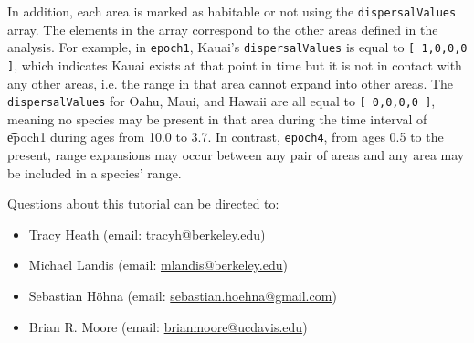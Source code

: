 In addition, each area is marked as habitable or not using the {\tt dispersalValues} array.
The elements in the array correspond to the other areas defined in the analysis.
For example, in {\tt epoch1}, Kauai's {\tt dispersalValues} is equal to {\tt [ 1,0,0,0 ]}, which indicates Kauai exists at that point in time but it is not in contact with any other areas, i.e. the range in that area cannot expand into other areas.
The {\tt dispersalValues} for Oahu, Maui, and Hawaii are all equal to {\tt [ 0,0,0,0 ]}, meaning no species may be present in that area during the time interval of {\t epoch1} during ages from 10.0 to 3.7. In contrast, {\tt epoch4}, from ages 0.5 to the present, range expansions may occur between any pair of areas and any area may be included in a species' range.


\vspace{5cm}
Questions about this tutorial can be directed to: \\\vspace{-10mm}
\begin{itemize}
\item Tracy Heath (email: \href{mailto:tracyh@berkeley.edu}{tracyh@berkeley.edu}) \\\vspace{-8mm}
\item Michael Landis (email: \href{mailto:mlandis@berkeley.edu}{mlandis@berkeley.edu}) \\\vspace{-8mm} 
\item Sebastian H\"{o}hna (email: \href{mailto:sebastian.hoehna@gmail.com}{sebastian.hoehna@gmail.com}) \\\vspace{-8mm}
\item Brian R. Moore (email: \href{mailto:brianmoore@ucdavis.edu}{brianmoore@ucdavis.edu}) \\\vspace{-8mm}
\end{itemize}




